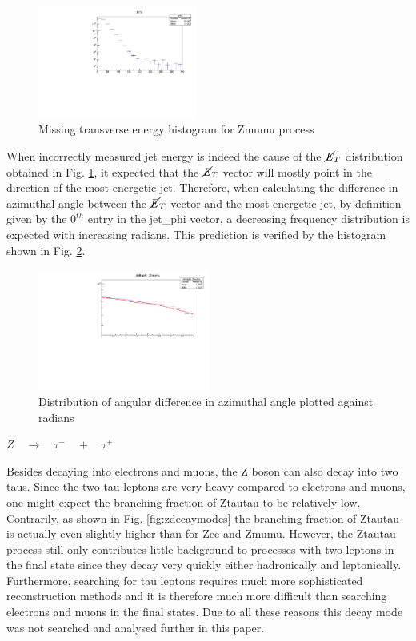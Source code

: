 \documentclass[runningheads,a4paper]{llncs}
\begin{document}
\begin{figure}
\centering
\includegraphics[height=3.7cm]{MTE_Zmumu_new}
\caption{Missing transverse energy histogram for Zmumu process}
\label{fig:mtezmumu}
\end{figure}

When incorrectly measured jet energy is indeed the cause of the $\cancel{\it{E}}_{T}$ distribution obtained in Fig. \ref{fig:mtezmumu}, it expected that the $\cancel{\it{E}}_{T}$ vector will mostly point in the  direction of the most energetic jet. Therefore, when calculating the difference in azimuthal angle between the $\cancel{\it{E}}_{T}$ vector and the most energetic jet, by definition given by the ${0}^{th}$ entry in the jet\_phi vector, a decreasing frequency distribution is expected with increasing radians. This prediction is verified by the histogram shown in Fig. \ref{fig:deltaphizmumu}. \\

\begin{figure}
\centering
\includegraphics[height=4cm]{deltaphi_jet0_met_Zmumu_fit}
\caption{Distribution of angular difference in azimuthal angle plotted against radians}
\label{fig:deltaphizmumu}
\end{figure}
\bigbreak
\begin{flushleft}
$Z\quad \rightarrow \quad \tau ^{ - }\quad +\quad { \tau  }^{ + }$
\end{flushleft}
\bigbreak
Besides decaying into electrons and muons, the Z boson can also decay into two taus. Since the two tau leptons are very heavy compared to electrons and muons, one might expect the branching fraction of Ztautau to be relatively low. Contrarily, as shown in Fig. \ref{fig:zdecaymodes} the branching fraction of Ztautau is actually even slightly higher than for Zee and Zmumu. However, the Ztautau process still only contributes little background to processes with two leptons in the final state since they decay very quickly either hadronically and leptonically. Furthermore, searching for tau leptons requires much more sophisticated reconstruction methods and it is therefore much more difficult than searching electrons and muons in the final states. Due to all these reasons this decay mode was not searched and analysed further in this paper.\\
\end{document}
